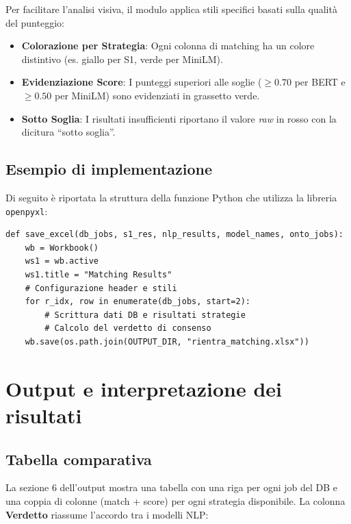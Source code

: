 \documentclass[12pt, a4paper]{report}
\begin{document}
Per facilitare l'analisi visiva, il modulo applica stili specifici basati sulla qualità del punteggio:

\begin{itemize}
    \item \textbf{Colorazione per Strategia}: Ogni colonna di matching ha un colore distintivo (es. giallo per S1, verde per MiniLM).
    \item \textbf{Evidenziazione Score}: I punteggi superiori alle soglie ($\geq 0.70$ per BERT e $\geq 0.50$ per MiniLM) sono evidenziati in grassetto verde.
    \item \textbf{Sotto Soglia}: I risultati insufficienti riportano il valore \textit{raw} in rosso con la dicitura ``sotto soglia''.
\end{itemize}
\newpage
\section{Esempio di implementazione}

Di seguito è riportata la struttura della funzione Python che utilizza la libreria \texttt{openpyxl}:

\begin{lstlisting}[caption={Snippet della funzione \texttt{save\_excel}}]
def save_excel(db_jobs, s1_res, nlp_results, model_names, onto_jobs):
    wb = Workbook()
    ws1 = wb.active
    ws1.title = "Matching Results"
    # Configurazione header e stili
    for r_idx, row in enumerate(db_jobs, start=2):
        # Scrittura dati DB e risultati strategie
        # Calcolo del verdetto di consenso
    wb.save(os.path.join(OUTPUT_DIR, "rientra_matching.xlsx"))
\end{lstlisting}

% 
\chapter{Output e interpretazione dei risultati}
% 

\section{Tabella comparativa}

La sezione 6 dell'output mostra una tabella con una riga per ogni
job del DB e una coppia di colonne (match + score) per ogni strategia
disponibile. La colonna \textbf{Verdetto} riassume l'accordo tra i
modelli NLP:
\end{document}
